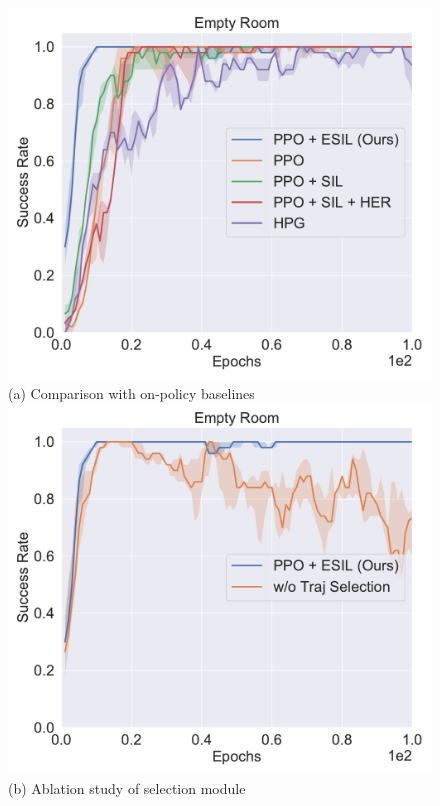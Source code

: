\begin{figure}[h!]
  \centering
  \includegraphics[width=\linewidth]{figures/chapter3/empty_room_baseline.pdf}
  ({a}) Comparison with on-policy baselines\hspace{3em} 
\endminipage
{}
  \centering
  \includegraphics[width=\linewidth]{figures/chapter3/empty_room_hs.pdf}
  ({b}) {Ablation study of selection module}
\endminipage\hfill

\end{figure}
